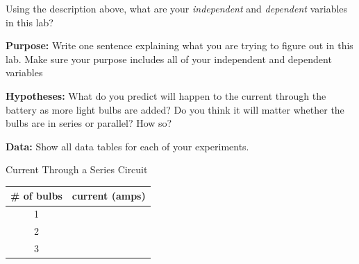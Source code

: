 \documentclass[10pt]{exam}
\begin{document}
\begin{questions}


  \question
    Using the description above, what are your \emph{independent} and \emph{dependent} variables in this lab? \vs
  
  \question
    \textbf{Purpose:} Write one sentence explaining what you are trying to figure out in this lab.  Make sure your purpose includes all of your independent and dependent variables \vs

  \question
    \textbf{Hypotheses:} What do you predict will happen to the current through the battery as more light bulbs are added?  Do you think it will matter whether the bulbs are in series or parallel?  How so? \vs

  \pagebreak

  \question
    \textbf{Data:} Show all data tables for each of your experiments.  

    \renewcommand{\arraystretch}{2}

    \begin{multicols}{2}
      Current Through a Series Circuit

      \begin{tabular}{|c|c|}
        \hline
        \# of bulbs & current (amps) \\\hline
        1 &\\\hline
        2 &\\\hline
        3 &\\\hline
      \end{tabular}


\end{multicols}
\end{questions}
\end{document}
